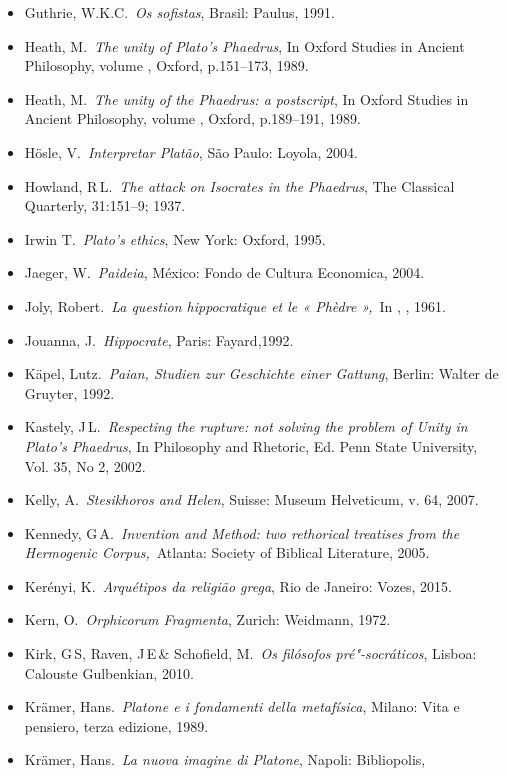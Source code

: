 {\begin{itemize}
\item
  Guthrie, W.K.C.~\emph{Os sofistas}, Brasil: Paulus, 1991.
\item
  Heath, M.~\emph{The unity of Plato's Phaedrus}, In Oxford Studies in
  Ancient Philosophy, volume , Oxford, p.151--173, 1989.
\item
  Heath, M.~\emph{The unity of the Phaedrus: a postscript}, In Oxford
  Studies in Ancient Philosophy, volume , Oxford, p.189--191, 1989.
\item
  Hösle, V.~\emph{Interpretar Platão}, São Paulo: Loyola, 2004.
\item
  Howland, R\,L.~\emph{The attack on Isocrates in the Phaedrus}, The
  Classical Quarterly, 31:151--9; 1937.
\item
  Irwin T.~\emph{Plato's ethics}, New York: Oxford, 1995.
\item
  Jaeger, W.~\emph{Paideia}, México: Fondo de Cultura Economica, 2004.
\item
  Joly, Robert.~\emph{La question hippocratique et le « Phèdre »,}~In
  , , 1961.
\item
  Jouanna, J.~\emph{Hippocrate}, Paris: Fayard,1992.
\item
  Käpel, Lutz.~\emph{Paian, Studien zur Geschichte einer Gattung},
  Berlin: Walter de Gruyter, 1992.
\item
  Kastely, J\,L.~\emph{Respecting the rupture: not solving the problem
  of Unity in Plato's Phaedrus}, In Philosophy and Rhetoric, Ed. Penn
  State University, Vol. 35, No 2, 2002.
\item
  Kelly, A.~\emph{Stesikhoros and Helen}, Suisse: Museum Helveticum, v.
  64, 2007.
\item
  Kennedy, G\,A.~\emph{Invention and Method: two rethorical treatises
  from the Hermogenic Corpus,}~Atlanta: Society of Biblical Literature,
  2005.
\item
  Kerényi, K.~\emph{Arquétipos da religião grega}, Rio de Janeiro:
  Vozes, 2015.
\item
  Kern, O.~\emph{Orphicorum Fragmenta}, Zurich: Weidmann, 1972.
\item
  Kirk, G\,S, Raven, J\,E\,\& Schofield, M.~\emph{Os filósofos
  pré"-socráticos}, Lisboa: Calouste Gulbenkian, 2010.
\item
  Krämer, Hans.~\emph{Platone e i fondamenti della metafísica}, Milano:
  Vita e pensiero, terza edizione, 1989.
\item
  Krämer, Hans.~\emph{La nuova imagine di Platone}, Napoli: Bibliopolis,

\end{itemize}}
